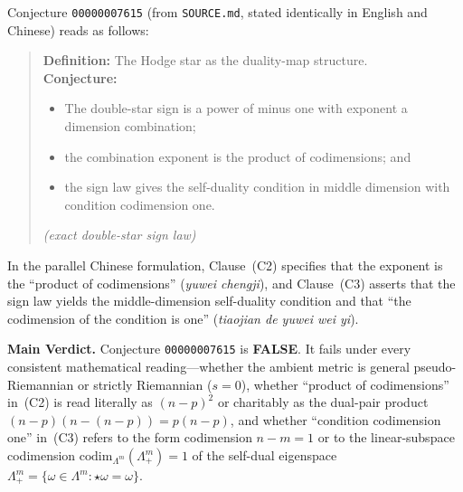 \documentclass[11pt]{article}
\theoremstyle{definition}
\newcommand{\codim}{\mathrm{codim}}
\begin{document}
Conjecture \texttt{00000007615} (from \texttt{SOURCE.md}, stated identically in English and Chinese) reads as follows:

\begin{quote}
\textbf{Definition:} The Hodge star as the duality-map structure.\\
\textbf{Conjecture:}
\begin{itemize}
  \item[(C1)] The double-star sign is a power of minus one with exponent a dimension combination;
  \item[(C2)] the combination exponent is the product of codimensions; and
  \item[(C3)] the sign law gives the self-duality condition in middle dimension with condition codimension one.
\end{itemize}
\emph{(exact double-star sign law)}
\end{quote}

In the parallel Chinese formulation, Clause~(C2) specifies that the exponent is the ``product of codimensions'' (\emph{yuwei chengji}), and Clause~(C3) asserts that the sign law yields the middle-dimension self-duality condition and that ``the codimension of the condition is one'' (\emph{tiaojian de yuwei wei yi}).

\medskip
\noindent\textbf{Main Verdict.} Conjecture \texttt{00000007615} is \textbf{FALSE}. It fails under every consistent mathematical reading---whether the ambient metric is general pseudo-Riemannian or strictly Riemannian ($s=0$), whether ``product of codimensions'' in~(C2) is read literally as $(n-p)^2$ or charitably as the dual-pair product $(n-p)(n-(n-p)) = p(n-p)$, and whether ``condition codimension one'' in~(C3) refers to the form codimension $n - m = 1$ or to the linear-subspace codimension $\codim_{\Lambda^m}(\Lambda^m_+) = 1$ of the self-dual eigenspace $\Lambda^m_+ = \{\omega \in \Lambda^m : \star\omega = \omega\}$.
\end{document}
